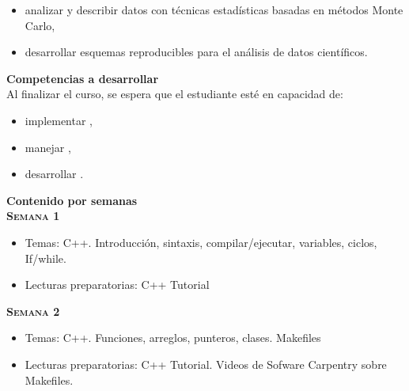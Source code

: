 \documentclass[letterpaper,10pt,onecolumn]{article}
\begin{document}
\begin{itemize}
\item analizar y describir datos con t\'ecnicas estad\'isticas basadas
  en m\'etodos Monte Carlo, \\[-0.6cm]
\item desarrollar esquemas reproducibles para el an\'alisis de datos cient\'ificos. \\[-0.6cm]
\end{itemize} 
\vspace*{0.5cm} 

\noindent\textbf{\large {} \quad Competencias a
  desarrollar}\\[-0.2cm] 


\noindent\normalsize Al finalizar el curso, se espera que el
estudiante est\'e en capacidad de: 

\begin{itemize}
\item implementar , \\[-0.6cm]   
\item manejar ,\\[-0.6cm]  
\item desarrollar .\\[-0.6cm]  
\end{itemize}

\vspace*{0.5cm} 

\noindent\textbf{\large {} \quad Contenido por
  semanas}\\[-0.2cm]  


\noindent\textbf{\textsc{Semana 1}}\\[-0.5cm]
\begin{itemize}
\item Temas: C++. Introducción, sintaxis, compilar/ejecutar,
variables, ciclos, If/while. \\[-0.6cm]
\item Lecturas preparatorias: C++ Tutorial\\[-0.6cm]
\end{itemize}


\noindent\textbf{\textsc{Semana 2}}\\[-0.5cm]
\begin{itemize}
\item Temas: C++. Funciones, arreglos, punteros, clases. Makefiles \\[-0.6cm]
\item Lecturas preparatorias: C++ Tutorial. Videos de Sofware
  Carpentry sobre Makefiles.\\[-0.6cm]  
\end{itemize}
\end{document}
